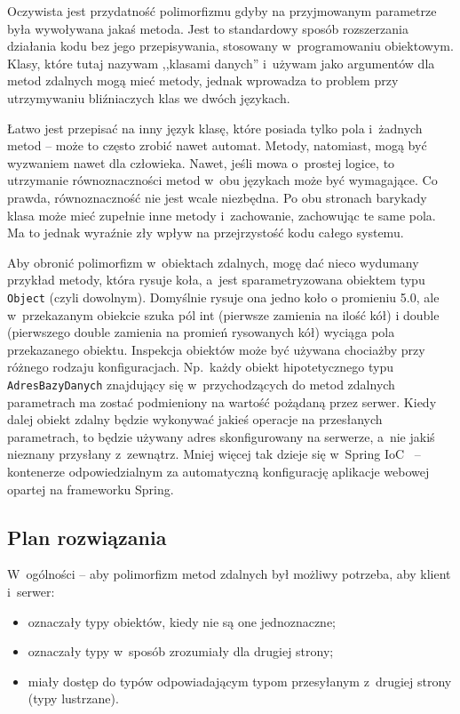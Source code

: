 Oczywista jest przydatność polimorfizmu gdyby na przyjmowanym parametrze była wywoływana jakaś metoda. Jest to standardowy sposób rozszerzania działania kodu bez jego przepisywania, stosowany w~programowaniu obiektowym.
Klasy, które tutaj nazywam ,,klasami danych'' i~używam jako argumentów dla metod zdalnych mogą mieć metody, jednak wprowadza to problem przy utrzymywaniu bliźniaczych klas we dwóch językach.

Łatwo jest przepisać na inny język klasę, które posiada tylko pola i~żadnych metod -- może to często zrobić nawet automat.
Metody, natomiast, mogą być wyzwaniem nawet dla człowieka. Nawet, jeśli mowa o~prostej logice, to utrzymanie równoznaczności metod w~obu językach może być wymagające.
Co prawda, równoznaczność nie jest wcale niezbędna. Po obu stronach barykady klasa może mieć zupełnie inne metody i~zachowanie, zachowując te same pola. Ma to jednak wyraźnie zły wpływ na przejrzystość kodu całego systemu.

Aby obronić polimorfizm w~obiektach zdalnych, mogę dać nieco wydumany przykład metody, która rysuje koła, a~jest sparametryzowana obiektem typu \texttt{Object} (czyli dowolnym). Domyślnie rysuje ona jedno koło o promieniu 5.0, ale w~przekazanym obiekcie szuka pól int (pierwsze zamienia na ilość kół) i double (pierwszego double zamienia na promień rysowanych kół) wyciąga pola przekazanego obiektu.
Inspekcja obiektów może być używana chociażby przy różnego rodzaju konfiguracjach. Np.\ każdy obiekt hipotetycznego typu \texttt{AdresBazyDanych} znajdujący się w~przychodzących do metod zdalnych parametrach ma zostać podmieniony na wartość pożądaną przez serwer. Kiedy dalej obiekt zdalny będzie wykonywać jakieś operacje na przesłanych parametrach, to będzie używany adres skonfigurowany na serwerze, a~nie jakiś nieznany przysłany z~zewnątrz.
Mniej więcej tak dzieje się w~Spring IoC~\cite{sping-ioc} -- kontenerze odpowiedzialnym za automatyczną konfigurację aplikacje webowej opartej na frameworku Spring.

%


\subsection{Plan rozwiązania}
W~ogólności -- aby polimorfizm metod zdalnych był możliwy potrzeba, aby klient i~serwer:
\begin{itemize}
	\item oznaczały typy obiektów, kiedy nie są one jednoznaczne;
	\item oznaczały typy w~sposób zrozumiały dla drugiej strony;
	\item miały dostęp do typów odpowiadającym typom przesyłanym z~drugiej strony (typy lustrzane).
\end{itemize}

